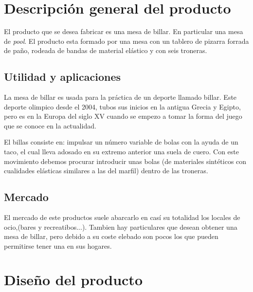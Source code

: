 \section {Descripción general del producto}
	El producto que se desea fabricar es una mesa de billar. En particular una mesa de \emph{pool}.
El producto esta formado por una  mesa con un tablero de pizarra forrada de paño, rodeada de bandas de material elástico y con seis troneras. 
	
	\subsection {Utilidad y aplicaciones}
	La mesa de billar es usada para la práctica de un deporte llamado billar. Este deporte olimpico desde el 2004, tubos sus inicios en la 
 antigua  Grecia y Egipto, pero es en la Europa del siglo XV cuando se empezo a tomar la forma del juego que se conoce en la actualidad. 

El billas consiste en: impulsar un número variable de bolas con la ayuda de un taco,  el cual lleva adosado en su extremo anterior una suela de cuero.
Con este movimiento debemos procurar introducir unas bolas (de materiales sintéticos con cualidades elásticas similares a las del marfil) dentro de las troneras.

	\subsection {Mercado}

El mercado de este productos suele abarcarlo en casí su totalidad los locales de ocio,(bares y recreatibos...). Tambien hay particulares que desean obtener una
mesa de billar, pero debido a su coste elebado son pocos los que pueden permitirse tener una en sus hogares. 
    
\section {Diseño del producto}

